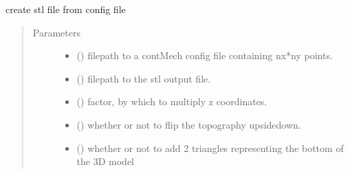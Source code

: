 \documentclass[letterpaper,10pt,english]{sphinxmanual}
\begin{document}
\begin{fulllineitems}
\label{\detokenize{stlutils:stlutils.convertFile}}
\sphinxAtStartPar
create stl file from config file
\begin{quote}\begin{description}
\item[{Parameters}] \leavevmode\begin{itemize}
\item {} 
\sphinxAtStartPar
{} () \textendash{} filepath to a contMech config file containing nx*ny points.

\item {} 
\sphinxAtStartPar
{} () \textendash{} filepath to the stl output file.

\item {} 
\sphinxAtStartPar
{} () \textendash{} factor, by which to multiply z coordinates.

\item {} 
\sphinxAtStartPar
{} () \textendash{} whether or not to flip the topography upside\sphinxhyphen{}down.

\item {} 
\sphinxAtStartPar
{} () \textendash{} whether or not to add 2 triangles representing the bottom of the 3D model

\end{itemize}

\end{description}\end{quote}

\end{fulllineitems}
\end{document}
